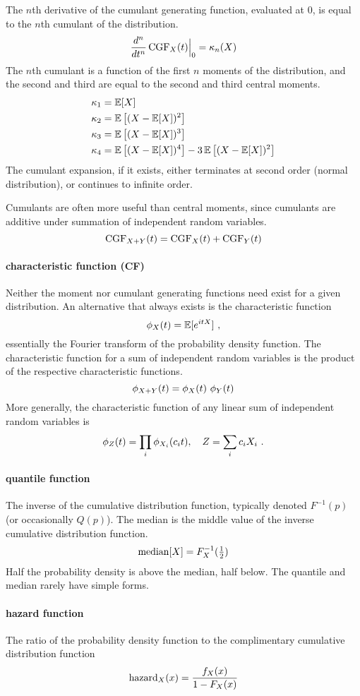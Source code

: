 The $n$th derivative of the cumulant generating function, evaluated at $0$, is equal to the $n$th cumulant of the distribution. 
\[
\frac{d^n}{dt^n}\operatorname{CGF}_X(t)\Big|_0 = \kappa_n(X)  
\]
The $n$th cumulant is a function of the first $n$ moments of the distribution, and the second and third are equal to the second and third central moments.
\begin{align*}
\kappa_1 &= \operatorname{\mathbb E}[X]  \\
\kappa_2 &= \operatorname{\mathbb E}\left[ (X-\operatorname{\mathbb E}[X])^2 \right] \\
\kappa_3 &= \operatorname{\mathbb E}\left[ (X-\operatorname{\mathbb E}[X])^3 \right]  \\
\kappa_4 &= \operatorname{\mathbb E}\left[ (X-\operatorname{\mathbb E}[X])^4 \right]  - 3 \operatorname{\mathbb E}\left[ (X-\operatorname{\mathbb E}[X])^2 \right] 
\end{align*}
The cumulant expansion, if it exists, either terminates at second order (normal distribution), or continues to infinite order.

Cumulants are often more useful than central moments, since cumulants are additive under summation of independent random variables. 
\[
\operatorname{CGF}_{X+Y}(t) = \operatorname{CGF}_{X}(t) + \operatorname{CGF}_{Y}(t)  
\notag
\]


\paragraph*{characteristic function (CF)} 
\label{characteristic_function}
Neither the moment nor cumulant generating functions need exist for a given distribution. An alternative that always exists is the characteristic function
\[
\phi_X(t) = \operatorname{\mathbb E}[e^{i t X}]  \ , 
\notag
\]
essentially the Fourier transform of the probability density function. The characteristic function for a  sum of independent random variables is the product of the respective characteristic functions. 
\[
\phi_{ X+ Y}(t) = \phi_{X}( t)\  \phi_{Y}(t) 
\notag
\]
More generally, the characteristic function of any linear sum of independent random variables is
\[
\phi_{Z}(t) = \prod_i \phi_{X_i}(c_i t), \quad Z = \sum_i c_i X_i \ .
\notag
\]


\paragraph*{quantile function} 
The inverse of the cumulative distribution function, typically denoted  $F^{-1}(p)$ (or occasionally
 $Q(p)$).
 The median is the middle value of the inverse cumulative distribution function. 
\[
\operatorname{median}[X] = F_X^{-1}(\tfrac{1}{2}) 
\notag
\]
Half the probability density is above the median, half below. 
The quantile and median rarely have simple forms.


\paragraph*{hazard function}
The ratio of the probability density function to the complimentary cumulative distribution function
\[
\operatorname{hazard}_X(x) = \frac{f_X(x)}{1-F_X(x)} 
\notag
\]


